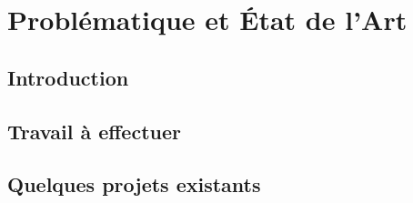 \chapter{Problématique et État de l'Art}
\label{ch:problematic}

\section{Introduction}

\section{Travail à effectuer}

\section{Quelques projets existants}